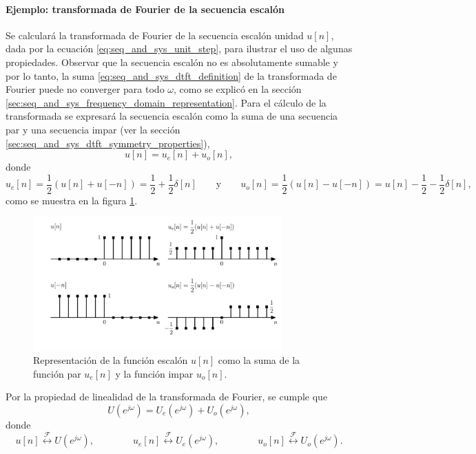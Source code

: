 \documentclass[a4paper]{report}
\begin{document}
\paragraph{Ejemplo: transformada de Fourier de la secuencia escalón} Se calculará la transformada de Fourier de la secuencia escalón unidad  \(u[n]\), dada por la ecuación \ref{eq:seq_and_sys_unit_step}, para ilustrar el uso de algunas propiedades. Observar que la secuencia escalón no es absolutamente sumable y por lo tanto, la suma \ref{eq:seq_and_sys_dtft_definition} de la transformada de Fourier puede no converger para todo \(\omega\), como se explicó en la sección \ref{sec:seq_and_sys_frequency_domain_representation}. Para el cálculo de la transformada se expresará la secuencia escalón como la suma de una secuencia par y una secuencia impar (ver la sección \ref{sec:seq_and_sys_dtft_symmetry_properties}),
\[
 u[n]=u_e[n]+u_o[n],
\]
donde
\[
 u_e[n]=\frac{1}{2}(u[n]+u[-n])=\frac{1}{2}+\frac{1}{2}\delta[n]
 \qquad\textrm{y}\qquad
 u_o[n]=\frac{1}{2}(u[n]-u[-n])=u[n]-\frac{1}{2}-\frac{1}{2}\delta[n],
\]
como se muestra en la figura \ref{fig:seq_and_sys_step_dtft_computation}.
\begin{figure}[!htb]
 \begin{center}
 \includegraphics[width=0.85\textwidth]{figuras/seq_and_sys_step_dtft_computation.pdf}
 \caption{\label{fig:seq_and_sys_step_dtft_computation} Representación de la función escalón \(u[n]\) como la suma de la función par \(u_e[n]\) y la función impar \(u_o[n]\).}
 \end{center}
\end{figure} 
Por la propiedad de linealidad de la transformada de Fourier, se cumple que 
\begin{equation}\label{eq:seq_and_sys_dtft_step_even_odd_sum_example}
 U(e^{j\omega})=U_e(e^{j\omega})+U_o(e^{j\omega}), 
\end{equation}
donde 
\[
 u[n]\overset{\mathcal{F}}{\longleftrightarrow}U(e^{j\omega}),
 \qquad\qquad 
 u_e[n]\overset{\mathcal{F}}{\longleftrightarrow}U_e(e^{j\omega}),
 \qquad\qquad
 u_o[n]\overset{\mathcal{F}}{\longleftrightarrow}U_o(e^{j\omega}).
\]
\end{document}
